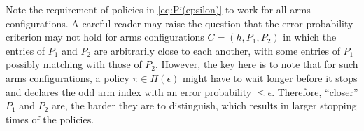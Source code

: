 Note the requirement of policies in \eqref{eq:Pi(epsilon)} to work for all arms configurations. A careful reader may raise the question that the error probability criterion may not hold for arms configurations $C=(h, P_1, P_2)$ in which the entries of $P_1$ and $P_2$ are arbitrarily close to each another, with some entries of $P_1$ possibly matching with those of $P_2$. However, the key here is to note that for such arms configurations, a policy $\pi\in \Pi(\epsilon)$ might have to wait longer before it stops and declares the odd arm index with an error probability $\leq \epsilon$. Therefore, ``closer'' $P_1$ and $P_2$ are, the harder they are to distinguish, which results in larger stopping times of the policies.

